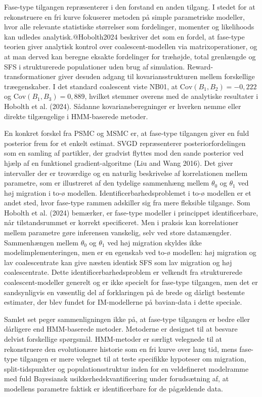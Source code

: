 \documentclass[
  10pt,
  a4paper,
]{scrbook}
\begin{document}
Fase-type tilgangen repræsenterer i den forstand en anden tilgang. I
stedet for at rekonstruere en fri kurve fokuserer metoden på simple
parametriske modeller, hvor alle relevante statistiske størrelser som
fordelinger, momenter og likelihoods kan udledes analytisk.@Hobolth2024
beskriver det som en fordel, at fase-type teorien giver analytisk
kontrol over coalescent-modellen via matrixoperationer, og at man derved
kan beregne eksakte fordelinger for træhøjde, total grenlængde og SFS i
strukturerede populationer uden brug af simulation.
Reward-transformationer giver desuden adgang til kovariansstrukturen
mellem forskellige træegenskaber. I det standard coalescent viste NB01,
at \(\text{Cov}(B_1, B_2) = -0{,}222\) og
\(\text{Cov}(B_1, B_3) = 0{,}889\), hvilket stemmer overens med de
analytiske resultater i Hobolth et al. (2024). Sådanne
kovariansberegninger er hverken nemme eller direkte tilgængelige i
HMM-baserede metoder.

En konkret forskel fra PSMC og MSMC er, at fase-type tilgangen giver en
fuld posterior frem for et enkelt estimat. SVGD repræsenterer
posteriorfordelingen som en samling af partikler, der gradvist flyttes
mod den sande posterior ved hjælp af en funktionel gradient-algoritme
(Liu and Wang 2016). Det giver intervaller der er troværdige og en
naturlig beskrivelse af korrelationen mellem parametre, som er
illustreret af den tydelige sammenhæng mellem \(\theta_0\) og
\(\theta_1\) ved høj migration i to-ø modellen.
Identificerbarhedsproblemet i to-ø modellen er et andet sted, hvor
fase-type rammen adskiller sig fra mere fleksible tilgange. Som Hobolth
et al. (2024) bemærker, er fase-type modeller i princippet
identificerbare, når tilstandsrummet er korrekt specificeret. Men i
praksis kan korrelationer mellem parametre gøre inferensen vanskelig,
selv ved store datamængder. Sammenhængen mellem \(\theta_0\) og
\(\theta_1\) ved høj migration skyldes ikke modelimplementeringen, men
er en egenskab ved to-ø modellen: høj migration og lav coalescentrate
kan give næsten identisk SFS som lav migration og høj coalescentrate.
Dette identificerbarhedsproblem er velkendt fra strukturerede
coalescent-modeller generelt og er ikke specielt for fase-type
tilgangen, men det er sandsynligvis en væsentlig del af forklaringen på
de brede og dårligt bestemte estimater, der blev fundet for
IM-modellerne på bavian-data i dette speciale.

Samlet set peger sammenligningen ikke på, at fase-type tilgangen er
bedre eller dårligere end HMM-baserede metoder. Metoderne er designet
til at besvare delvist forskellige spørgsmål. HMM-metoder er særligt
velegnede til at rekonstruere den evolutionære historie som en fri kurve
over lang tid, mens fase-type tilgangen er mere velegnet til at teste
specifikke hypoteser om migration, split-tidspunkter og
populationsstruktur inden for en veldefineret modelramme med fuld
Bayesiansk usikkerhedskvantificering under forudsætning af, at modellens
parametre faktisk er identificerbare for de pågældende data.
\end{document}
